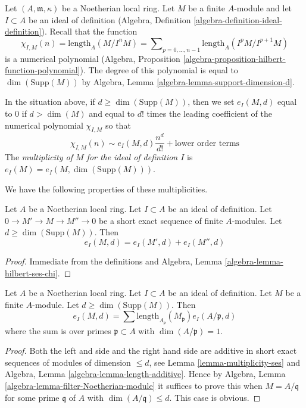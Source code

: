 \noindent
Let $(A, \mathfrak m, \kappa)$ be a Noetherian local ring.
Let $M$ be a finite $A$-module and let $I \subset A$ be an ideal
of definition (Algebra, Definition \ref{algebra-definition-ideal-definition}).
Recall that the function
$$
\chi_{I, M}(n) = \text{length}_A(M/I^nM) =
\sum\nolimits_{p = 0, \ldots, n - 1} \text{length}_A(I^pM/I^{p + 1}M)
$$
is a numerical polynomial
(Algebra, Proposition \ref{algebra-proposition-hilbert-function-polynomial}).
The degree of this polynomial is equal to $\dim(\text{Supp}(M))$ by
Algebra, Lemma \ref{algebra-lemma-support-dimension-d}.

\begin{definition}
\label{definition-multiplicity}
In the situation above, if $d \geq \dim(\text{Supp}(M))$, then we set
$e_I(M, d)$ equal to $0$ if $d > \dim(M)$ and equal to $d!$ times the
leading coefficient of the numerical polynomial $\chi_{I, M}$ so that
$$
\chi_{I, M}(n) \sim e_I(M, d) \frac{n^d}{d!} + \text{lower order terms}
$$
The {\it multiplicity of $M$ for the ideal of definition $I$}
is $e_I(M) = e_I(M, \dim(\text{Supp}(M)))$.
\end{definition}

\noindent
We have the following properties of these multiplicities.

\begin{lemma}
\label{lemma-multiplicity-ses}
Let $A$ be a Noetherian local ring. Let $I \subset A$ be an ideal of
definition. Let $0 \to M' \to M \to M'' \to 0$ be a short exact sequence
of finite $A$-modules. Let $d \geq \dim(\text{Supp}(M))$. Then
$$
e_I(M, d) = e_I(M', d) + e_I(M'', d)
$$
\end{lemma}

\begin{proof}
Immediate from the definitions and
Algebra, Lemma \ref{algebra-lemma-hilbert-ses-chi}.
\end{proof}

\begin{lemma}
\label{lemma-multiplicity-as-a-sum}
Let $A$ be a Noetherian local ring. Let $I \subset A$ be an ideal of
definition. Let $M$ be a finite $A$-module. Let $d \geq \dim(\text{Supp}(M))$.
Then
$$
e_I(M, d) =
\sum \text{length}_{A_\mathfrak p}(M_\mathfrak p) e_I(A/\mathfrak p, d)
$$
where the sum is over primes $\mathfrak p \subset A$ with
$\dim(A/\mathfrak p) = 1$.
\end{lemma}

\begin{proof}
Both the left and side and the right hand side are additive in short
exact sequences of modules of dimension $\leq d$, see
Lemma \ref{lemma-multiplicity-ses} and
Algebra, Lemma \ref{algebra-lemma-length-additive}.
Hence by Algebra, Lemma \ref{algebra-lemma-filter-Noetherian-module}
it suffices to prove this when $M = A/\mathfrak q$ for some
prime $\mathfrak q$ of $A$ with $\dim(A/\mathfrak q) \leq d$.
This case is obvious.
\end{proof}

